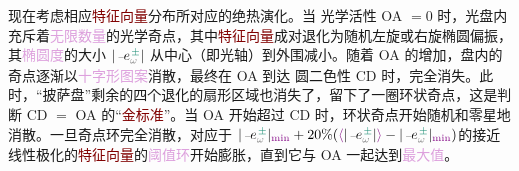 现在考虑相应\textcolor{Maroon}{特征向量}分布所对应的\textcolor{NavyBlue}{绝热演化}。当 \textcolor{NavyBlue}{光学活性 OA} $= 0$ 时，光盘内充斥着\textcolor{Plum}{无限数量}的\textcolor{PineGreen}{光学奇点}，其中\textcolor{Maroon}{特征向量}成对退化为随机\textcolor{NavyBlue}{左旋}或\textcolor{NavyBlue}{右旋}\textcolor{PineGreen}{椭圆偏振}，其\textcolor{Plum}{椭圆度}的大小 $|\Xint{\begin{smallmatrix} ~ \\ {}^{}_{\mathcolor{gray}{-}} \\ ~ \end{smallmatrix}}{08}{e}^{\;\!\textcolor{PineGreen}{\pm}}_{\mathcolor{gray}{\omega}}|$ 从中心（即\textcolor{PineGreen}{光轴}）到外围减小。随着 \textcolor{NavyBlue}{OA} 的增加，\textcolor{PineGreen}{盘}内的\textcolor{PineGreen}{奇点}逐渐以\textcolor{Plum}{十字形图案}消散，最终在 \textcolor{NavyBlue}{OA} 到达 \textcolor{NavyBlue}{圆二色性 CD} 时，完全消失。此时，“\textcolor{PineGreen}{披萨盘}”剩余的四个\textcolor{PineGreen}{退化的}扇形区域也消失了，留下了一圈\textcolor{PineGreen}{环状奇点}，这是判断 \textcolor{NavyBlue}{CD} $=$ \textcolor{NavyBlue}{OA} 的“\textcolor{Maroon}{金标准}”。当 \textcolor{NavyBlue}{OA} 开始超过 \textcolor{NavyBlue}{CD} 时，\textcolor{PineGreen}{环状奇点}开始随机和零星地消散。一旦\textcolor{PineGreen}{奇点环}完全消散，对应于 $|\Xint{\begin{smallmatrix} ~ \\ {}^{}_{\mathcolor{gray}{-}} \\ ~ \end{smallmatrix}}{08}{e}^{\;\!\textcolor{PineGreen}{\pm}}_{\mathcolor{gray}{\omega}}|_{\textcolor{Plum}{\min}} + 20\% (\textcolor{Plum}{\langle\textcolor{black}{|\Xint{\begin{smallmatrix} ~ \\ {}^{}_{\mathcolor{gray}{-}} \\ ~ \end{smallmatrix}}{08}{e}^{\;\!\textcolor{PineGreen}{\pm}}_{\mathcolor{gray}{\omega}}|}\rangle} - |\Xint{\begin{smallmatrix} ~ \\ {}^{}_{\mathcolor{gray}{-}} \\ ~ \end{smallmatrix}}{08}{e}^{\;\!\textcolor{PineGreen}{\pm}}_{\mathcolor{gray}{\omega}}|_{\textcolor{Plum}{\min}})$的接近\textcolor{PineGreen}{线性极化}的\textcolor{Maroon}{特征向量}的\textcolor{Plum}{阈值环}开始膨胀，直到它与 \textcolor{NavyBlue}{OA} 一起达到\textcolor{Plum}{最大值}。

